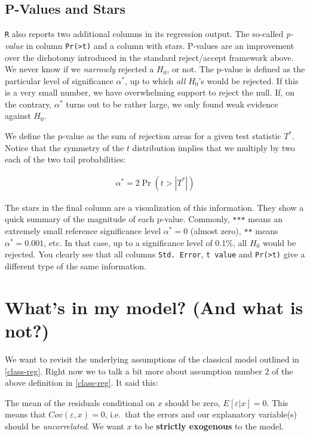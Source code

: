 \documentclass[]{book}
\newenvironment{warning}{\begin{tcolorbox}[colback=orange!5!white,colframe=orange]}{\end{tcolorbox}}
\begin{document}
\subsection{P-Values and Stars}\label{p-values-and-stars}

\texttt{R} also reports two additional columns in its regression output.
The so-called \emph{p-value} in column
\texttt{Pr(\textgreater{}\textbar{}t\textbar{})} and a column with
stars. P-values are an improvement over the dichotomy introduced in the
standard reject/accept framework above. We never know if we
\emph{narrowly} rejected a \(H_0\), or not. The p-value is defined as
the particular level of significance \(\alpha^*\), up to which
\emph{all} \(H_0\)'s would be rejected. If this is a very small number,
we have overwhelming support to reject the null. If, on the contrary,
\(\alpha^*\) turns out to be rather large, we only found weak evidence
against \(H_0\).

We define the p-value as the sum of rejection areas for a given test
statistic \(T^*\). Notice that the symmetry of the \(t\) distribution
implies that we multiply by two each of the two tail probabilities:

\begin{align}
\alpha^* = 2 \Pr(t > |T^*|) 
\end{align}

The stars in the final column are a visualization of this information.
They show a quick summary of the magnitude of each p-value. Commonly,
\texttt{***} means an extremely small reference significance level
\(\alpha^*=0\) (almost zero), \texttt{**} means \(\alpha^*=0.001\), etc.
In that case, up to a significance level of 0.1\%, all \(H_0\) would be
rejected. You clearly see that all columns \texttt{Std.\ Error},
\texttt{t\ value} and \texttt{Pr(\textgreater{}\textbar{}t\textbar{})}
give a different type of the same information.

\section{What's in my model? (And what is
not?)}\label{whats-in-my-model-and-what-is-not}

We want to revisit the underlying assumptions of the classical model
outlined in \ref{class-reg}. Right now we to talk a bit more about
assumption number 2 of the above definition in \ref{class-reg}. It said
this:

\begin{warning}
The mean of the residuals conditional on \(x\) should be zero,
\(E[\varepsilon|x] = 0\). This means that \(Cov(\varepsilon,x) = 0\),
i.e.~that the errors and our explanatory variable(s) should be
\emph{uncorrelated}. We want \(x\) to be \textbf{strictly exogenous} to
the model.
\end{warning}
\end{document}
